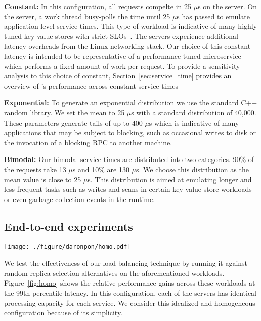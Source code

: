 \noindent\textbf{Constant:} In this configuration, all requests compelte in 25 $\mu$s on the server.  
%
On the server, a work thread busy-polls the time until 25 $\mu$s has passed to emulate application-level service times.
%
This type of workload is indicative of many highly tuned key-value stores with strict
SLOs~\cite{memcached,rocksdb}.  
%
The servers experience additional latency overheads from the Linux networking stack.  Our choice of this constant latency is intended to be representative of a performance-tuned microservice which performs a fixed amount of work per request. 
%
To provide a sensitivity analysis to this choice of constant, Section~\ref{sec:service_time} provides an overview of \daronpon's performance across constant service times 
%

\noindent\textbf{Exponential:} To generate an exponential distribution we use the
standard C++ random library. We set the mean to 25 $\mu$s with a standard
distribution of 40,000. These parameters generate tails of up to 400 $\mu$s
which is indicative of many applications that may be subject to blocking, such
as occasional writes to disk or the invocation of a blocking RPC to another
machine.

\noindent\textbf{Bimodal:} Our bimodal service times are distributed into two
categories. 90\% of the requests take 13 $\mu$s and 10\% are 130 $\mu$s.  We
choose this distribution as the mean value is close to 25 $\mu$s. This
distribution is aimed at emulating longer and less frequent tasks such as
writes and scans in certain key-value store workloads or even garbage
collection events in the runtime.

\subsection{End-to-end experiments}

\begin{figure*}
  \texttt{[image: ./figure/daronpon/homo.pdf]}
  \caption{99th percentile latency improvements on three common
    service distributions (Constant, Bimodal, Exponential). Each
    server is provisioned with homogeneous processing power.}
  \label{fig:homo}
\end{figure*}

We test the effectiveness of our load balancing technique by running it against
random replica selection alternatives on the aforementioned workloads.
Figure~\ref{fig:homo} shows the relative performance gains across these
workloads at the 99th percentile latency. In this configuration, each of the
servers has identical processing capacity for each service.  We consider this
idealized and homogeneous configuration because of its simplicity.


